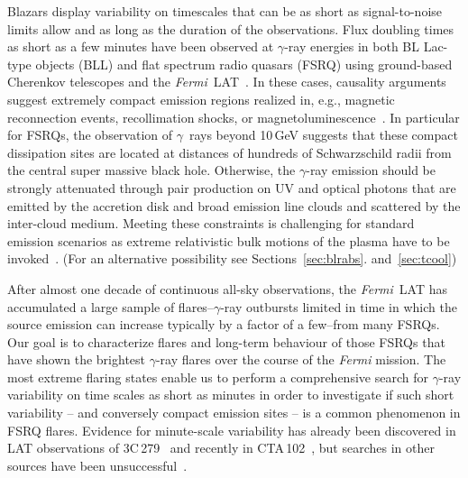 \documentclass[twocolumn,linenumbers]{aastex62}
\newcommand{\Grays}{$\gamma$~rays\xspace}
\newcommand{\gray}{$\gamma$-ray\xspace}
\newcommand{\Fermi}{\emph{Fermi}\xspace}
\newcommand{\FermiLAT}{\emph{Fermi}~LAT\xspace}
\begin{document}
Blazars display variability on timescales that can be as short as signal-to-noise limits allow and as long as the duration of the observations.
Flux doubling times as short as a few minutes have been observed at \gray energies in both BL Lac-type objects (BLL) and flat spectrum radio quasars (FSRQ) using  ground-based Cherenkov telescopes and the \FermiLAT~\cite[e.g.,][]{2007ApJ...669..862A,pks2155hess2007,pks1222magic2011,2013ApJ...762...92A,2014Sci...346.1080A,TheFermi-LAT:2016dss,2018ApJ...854L..26S}.
In these cases, causality arguments suggest extremely compact emission regions realized in, e.g., magnetic reconnection events, recollimation shocks, or magnetoluminescence~\cite[e.g.][]{Petropoulou:2016xat,Bodo:2017qqn,blandford:2017mag}.
In particular for FSRQs, the observation of \Grays beyond 10\,GeV suggests that these compact dissipation sites are located at distances of hundreds of Schwarzschild  radii from the central super massive black hole. 
Otherwise, the \gray emission should be strongly attenuated through pair production on UV and optical photons that are emitted by the accretion disk and broad emission line clouds and scattered by the inter-cloud medium.
Meeting these constraints is challenging for standard emission scenarios as extreme relativistic bulk motions of the plasma have to be invoked~\cite[e.g.,][]{TheFermi-LAT:2016dss}.  (For an alternative possibility see Sections~\ref{sec:blrabs}. and~\ref{sec:tcool})

After almost one decade of continuous all-sky observations, the \FermiLAT has accumulated a large sample of flares--\gray outbursts limited in time in which the source emission can increase typically by a factor of a few--from many FSRQs.
Our goal is to characterize flares and long-term behaviour of those FSRQs that have shown the brightest \gray flares over the course of the \Fermi mission. 
The most extreme flaring states enable us to perform a comprehensive search for \gray variability on time scales as short as minutes in order to investigate if such short variability -- and conversely compact emission sites -- is a common phenomenon in FSRQ flares. 
Evidence for minute-scale variability has already been discovered in LAT observations of 3C\,279~\citep{TheFermi-LAT:2016dss} and recently in CTA\,102~\citep{2018ApJ...854L..26S}, but searches in other sources have been unsuccessful~\citep{2017Galax...5..100N}.
\end{document}
